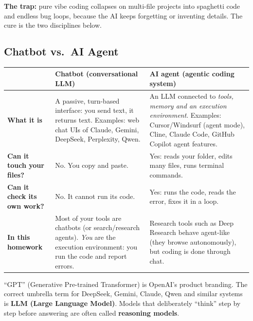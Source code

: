 \documentclass[11pt,a4paper]{article}
\begin{document}
\textbf{The trap:} pure vibe coding collapses on multi-file projects into spaghetti code and endless bug loops, because the AI keeps forgetting or inventing details. The cure is the two disciplines below.

\subsection{Chatbot vs.\ AI Agent}
\begin{tabularx}{\textwidth}{@{}>{\bfseries}p{2.6cm}L L@{}}
\toprule
 & \textbf{Chatbot (conversational LLM)} & \textbf{AI agent (agentic coding system)}\\
\midrule
What it is & A passive, turn-based interface: you send text, it returns text. Examples: web chat UIs of Claude, Gemini, DeepSeek, Perplexity, Qwen. & An LLM connected to \emph{tools, memory and an execution environment}. Examples: Cursor/Windsurf (agent mode), Cline, Claude Code, GitHub Copilot agent features.\\
Can it touch your files? & No. You copy and paste. & Yes: reads your folder, edits many files, runs terminal commands.\\
Can it check its own work? & No. It cannot run its code. & Yes: runs the code, reads the error, fixes it in a loop.\\
In this homework & Most of your tools are chatbots (or search/research agents). \emph{You} are the execution environment: you run the code and report errors. & Research tools such as Deep Research behave agent-like (they browse autonomously), but coding is done through chat.\\
\bottomrule
\end{tabularx}

\begin{notebox}
``GPT'' (Generative Pre-trained Transformer) is OpenAI's product branding. The correct umbrella term for DeepSeek, Gemini, Claude, Qwen and similar systems is \textbf{LLM (Large Language Model)}. Models that deliberately ``think'' step by step before answering are often called \textbf{reasoning models}.
\end{notebox}
\end{document}
